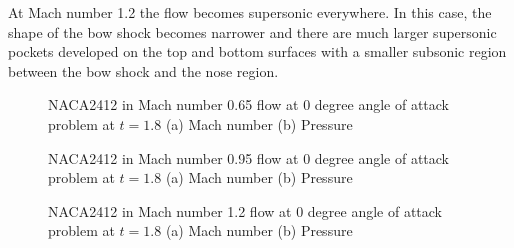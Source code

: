 At Mach number 1.2 the flow becomes supersonic everywhere. 
In this case, the shape of the bow shock becomes narrower and there are much larger supersonic pockets developed on the top and bottom
surfaces with a smaller subsonic region between the bow shock and the nose region.

\begin{figure}[ht]
\begin{center}
\caption{
  NACA2412 in Mach number 0.65 flow at 0 degree angle of attack problem at $t=1.8$ (a) Mach number (b) Pressure
}
\end{center}
\end{figure}



\begin{figure}[ht]
\begin{center}
\caption{
  NACA2412 in Mach number 0.95 flow at 0 degree angle of attack problem at $t=1.8$ (a) Mach number (b) Pressure
}
\end{center}
\end{figure}



\begin{figure}[ht]
\begin{center}
\caption{
  NACA2412 in Mach number 1.2 flow at 0 degree angle of attack problem at $t=1.8$ (a) Mach number (b) Pressure
}
\end{center}
\end{figure}





